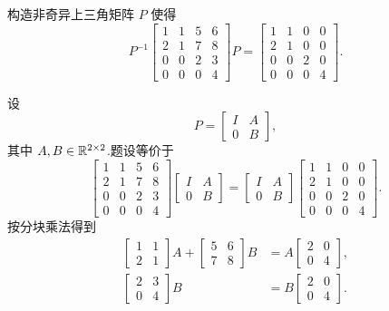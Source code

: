 \begin{problem}
构造非奇异上三角矩阵 $P$ 使得
\[
P^{-1}
\begin{bmatrix}
1 & 1 & 5 & 6\\
2 & 1 & 7 & 8\\
0 & 0 & 2 & 3\\
0 & 0 & 0 & 4
\end{bmatrix}
P=
\begin{bmatrix}
1 & 1 & 0 & 0\\
2 & 1 & 0 & 0\\
0 & 0 & 2 & 0\\
0 & 0 & 0 & 4
\end{bmatrix}.
\]
\begin{solution}
设
\[
P=
\left[
\begin{array}{c|c}
I&A\\ \hline
0&B
\end{array}
\right],
\]
其中 $A,B\in\mathbb{R}^{2\times2}$.题设等价于
\[
\left[
\begin{array}{cc|cc}
1&1&5&6\\
2&1&7&8\\ \hline
0&0&2&3\\
0&0&0&4
\end{array}
\right]
\left[
\begin{array}{c|c}
I&A\\ \hline
0&B
\end{array}
\right]
=
\left[
\begin{array}{c|c}
I&A\\ \hline
0&B
\end{array}
\right]
\left[
\begin{array}{cc|cc}
1&1&0&0\\
2&1&0&0\\ \hline
0&0&2&0\\
0&0&0&4
\end{array}
\right].
\]
按分块乘法得到
\begin{align}
\begin{bmatrix}1&1\\2&1\end{bmatrix}A+\begin{bmatrix}5&6\\7&8\end{bmatrix}B
&=A\begin{bmatrix}2&0\\0&4\end{bmatrix},\tag{1}\\
\begin{bmatrix}2&3\\0&4\end{bmatrix}B
&=B\begin{bmatrix}2&0\\0&4\end{bmatrix}. \tag{2}
\end{align}


\end{solution}
\end{problem}
